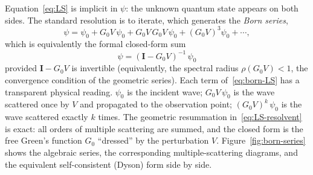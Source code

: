 \documentclass[11pt]{article}
\begin{document}
Equation~\eqref{eq:LS} is implicit in $\psi$: the unknown quantum state
appears on both sides.  The standard resolution is to iterate, which
generates the \emph{Born series},
\begin{equation}
\psi = \psi_0 + G_0 V\,\psi_0 + G_0 V\,G_0 V\,\psi_0 + (G_0 V)^3 \psi_0 + \cdots ,
\label{eq:born-LS}
\end{equation}
which is equivalently the formal closed-form sum
\begin{equation}
\psi = (\mathbf{I} - G_0 V)^{-1}\,\psi_0
\label{eq:LS-resolvent}
\end{equation}
provided $\mathbf{I} - G_0 V$ is invertible (equivalently, the
spectral radius $\rho(G_0 V) < 1$, the convergence condition of the
geometric series).  Each term of~\eqref{eq:born-LS} has a transparent
physical reading.  $\psi_0$ is the incident wave; $G_0 V\,\psi_0$ is
the wave scattered once by $V$ and propagated to the observation
point; $(G_0 V)^k\,\psi_0$ is the wave scattered exactly $k$ times.
The geometric resummation in~\eqref{eq:LS-resolvent} is exact: all
orders of multiple scattering are summed, and the closed form is the
free Green's function $G_0$ ``dressed'' by the perturbation $V$.
Figure~\ref{fig:born-series} shows the algebraic series, the
corresponding multiple-scattering diagrams, and the equivalent
self-consistent (Dyson) form side by side.
\end{document}
